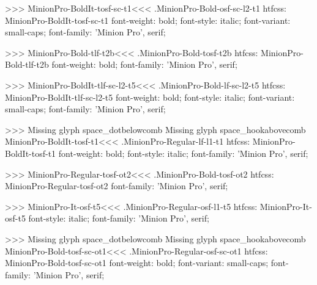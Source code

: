{>>>
\<MinionPro-BoldIt-tosf-sc-t1\><<<
.MinionPro-Bold-osf-sc-l2-t1
htfcss:  MinionPro-BoldIt-tosf-sc-t1  font-weight: bold; font-style: italic; font-variant: small-caps; font-family: 'Minion Pro', serif;

>>>
\<MinionPro-Bold-tlf-t2b\><<<
.MinionPro-Bold-tosf-t2b
htfcss:  MinionPro-Bold-tlf-t2b  font-weight: bold; font-family: 'Minion Pro', serif;

>>>
\<MinionPro-BoldIt-tlf-sc-l2-t5\><<<
.MinionPro-Bold-lf-sc-l2-t5
htfcss:  MinionPro-BoldIt-tlf-sc-l2-t5  font-weight: bold; font-style: italic; font-variant: small-caps; font-family: 'Minion Pro', serif;

>>>
Missing glyph	space_dotbelowcomb
Missing glyph	space_hookabovecomb
\<MinionPro-BoldIt-tosf-t1\><<<
.MinionPro-Regular-lf-l1-t1
htfcss:  MinionPro-BoldIt-tosf-t1  font-weight: bold; font-style: italic; font-family: 'Minion Pro', serif;

>>>
\<MinionPro-Regular-tosf-ot2\><<<
.MinionPro-Bold-tosf-ot2
htfcss:  MinionPro-Regular-tosf-ot2  font-family: 'Minion Pro', serif;

>>>
\<MinionPro-It-osf-t5\><<<
.MinionPro-Regular-osf-l1-t5
htfcss:  MinionPro-It-osf-t5  font-style: italic; font-family: 'Minion Pro', serif;

>>>
Missing glyph	space_dotbelowcomb
Missing glyph	space_hookabovecomb
\<MinionPro-Bold-tosf-sc-ot1\><<<
.MinionPro-Regular-osf-sc-ot1
htfcss:  MinionPro-Bold-tosf-sc-ot1  font-weight: bold; font-variant: small-caps; font-family: 'Minion Pro', serif;

}
